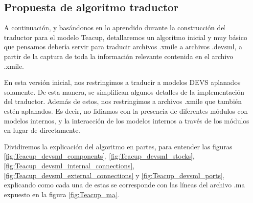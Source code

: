 \subsection{Propuesta de algoritmo traductor}
A continuación, y basándonos en lo aprendido durante la construcción del traductor para el modelo Teacup, detallaremos un algoritmo inicial y muy básico que pensamos debería servir para traducir archivos .xmile a archivos .devsml, a partir de la captura de toda la información relevante contenida en el archivo .xmile.

En esta versión inicial, nos restringimos a traducir a modelos DEVS aplanados solamente. De esta manera, se simplifican algunos detalles de la implementación del traductor. Además de estos, nos restringimos a archivos .xmile que también estén aplanados. Es decir, no lidiamos con la presencia de diferentes módulos con modelos internos, y la interacción de los modelos internos a través de los módulos en lugar de directamente.

Dividiremos la explicación del algoritmo en partes, para entender las figuras \ref{fig:Teacup_devsml_components}, \ref{fig:Teacup_devsml_stocks}, \ref{fig:Teacup_devsml_internal_connections}, \ref{fig:Teacup_devsml_external_connections} y \ref{fig:Teacup_devsml_ports}, explicando como cada una de estas se corresponde con las líneas del archivo .ma expuesto en la figura \ref{fig:Teacup_ma}.

